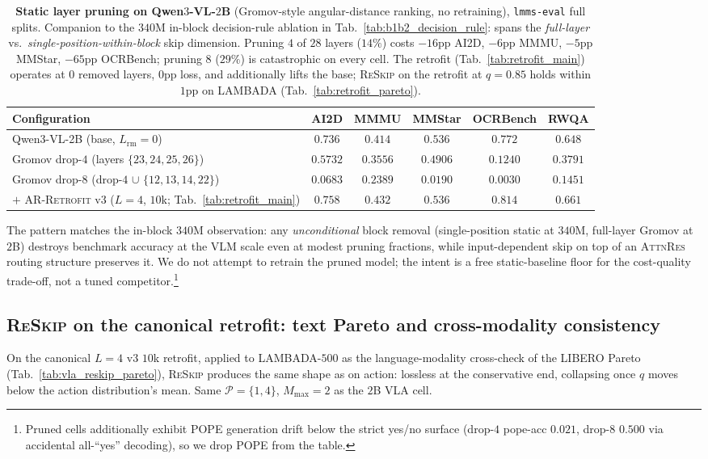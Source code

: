 \documentclass{article}
\newcommand{\attnres}{\textsc{AttnRes}}
\newcommand{\reskip}{\textsc{ReSkip}}
\newcommand{\retrofit}{\textsc{AR-Retrofit}}
\begin{document}
\begin{table}[h]
\caption{\textbf{Static layer pruning on Qwen$3$-VL-$2$B} (Gromov-style angular-distance ranking, no retraining), \texttt{lmms-eval} full splits. Companion to the $340$M in-block decision-rule ablation in Tab.~\ref{tab:b1b2_decision_rule}: spans the \emph{full-layer} vs.\ \emph{single-position-within-block} skip dimension. Pruning $4$ of $28$ layers ($14\%$) costs $-16$pp AI2D, $-6$pp MMMU, $-5$pp MMStar, $-65$pp OCRBench; pruning $8$ ($29\%$) is catastrophic on every cell. The retrofit (Tab.~\ref{tab:retrofit_main}) operates at $0$ removed layers, $0$pp loss, and additionally lifts the base; \reskip{} on the retrofit at $q{=}0.85$ holds within $1$pp on LAMBADA (Tab.~\ref{tab:retrofit_pareto}).}
\label{tab:gromov_pruning_2b}
\centering\small
\setlength{\tabcolsep}{4pt}
\begin{tabular}{lccccc}
\toprule
Configuration & AI2D & MMMU & MMStar & OCRBench & RWQA \\
\midrule
Qwen3-VL-2B (base, $L_{\text{rm}}{=}0$)            & $0.736$ & $0.414$ & $0.536$ & $0.772$ & $0.648$ \\
Gromov drop-$4$ (layers $\{23,24,25,26\}$)         & $0.5732$ & $0.3556$ & $0.4906$ & $0.1240$ & $0.3791$ \\
Gromov drop-$8$ (drop-$4$ $\cup$ $\{12,13,14,22\}$) & $0.0683$ & $0.2389$ & $0.0190$ & $0.0030$ & $0.1451$ \\
\midrule
$+$ \retrofit{} v3 ($L{=}4$, $10$k; Tab.~\ref{tab:retrofit_main}) & $\mathbf{0.758}$ & $\mathbf{0.432}$ & $\mathbf{0.536}$ & $\mathbf{0.814}$ & $\mathbf{0.661}$ \\
\bottomrule
\end{tabular}
\end{table}

The pattern matches the in-block $340$M observation: any
\emph{unconditional} block removal (single-position static at
$340$M, full-layer Gromov at $2$B) destroys benchmark accuracy at
the VLM scale even at modest pruning fractions, while
input-dependent skip on top of an \attnres{} routing structure
preserves it. We do not attempt to retrain the pruned model; the
intent is a free static-baseline floor for the cost-quality
trade-off, not a tuned competitor.\footnote{Pruned cells additionally
exhibit POPE generation drift below the strict yes/no surface
(drop-$4$ pope-acc $0.021$, drop-$8$ $0.500$ via accidental
all-``yes'' decoding), so we drop POPE from the table.}

\subsection{\reskip{} on the canonical retrofit: text Pareto and cross-modality consistency}
\label{app:retrofit_pareto}
On the canonical $L{=}4$ v3 $10$k retrofit, applied to LAMBADA-$500$ as the language-modality cross-check of the LIBERO Pareto (Tab.~\ref{tab:vla_reskip_pareto}), \reskip{} produces the same shape as on action: lossless at the conservative end, collapsing once $q$ moves below the action distribution's mean. Same $\mathcal{P}{=}\{1,4\}$, $M_{\max}{=}2$ as the $2$B VLA cell.
\end{document}
